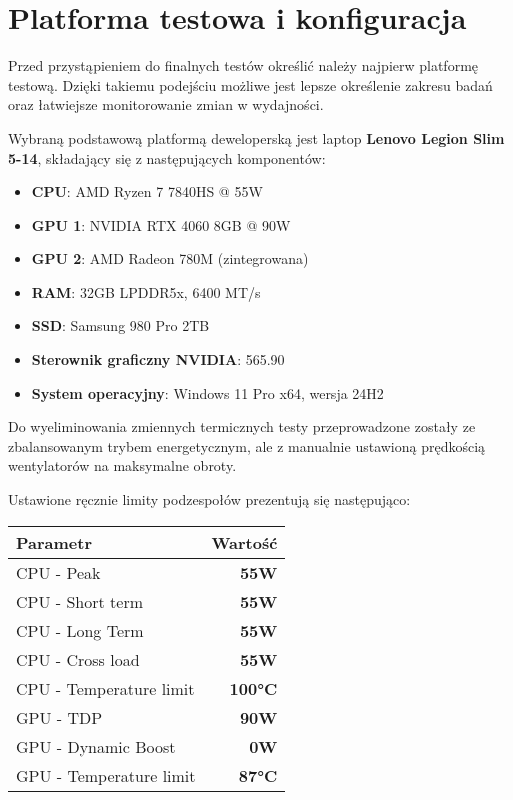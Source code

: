 \chapter{Platforma testowa i konfiguracja}

Przed przystąpieniem do finalnych testów określić należy najpierw
platformę testową. Dzięki takiemu podejściu możliwe jest lepsze określenie zakresu
badań oraz łatwiejsze monitorowanie zmian w wydajności.

Wybraną podstawową platformą deweloperską jest laptop \textbf{Lenovo Legion Slim 5-14}, składający się z następujących komponentów:

\begin{itemize}
	\item \textbf{CPU}: AMD Ryzen 7 7840HS @ 55W
	\item \textbf{GPU 1}: NVIDIA RTX 4060 8GB @ 90W
	\item \textbf{GPU 2}: AMD Radeon 780M (zintegrowana)
	\item \textbf{RAM}: 32GB LPDDR5x, 6400 MT/s
	\item \textbf{SSD}: Samsung 980 Pro 2TB
	\item \textbf{Sterownik graficzny NVIDIA}: 565.90
	\item \textbf{System operacyjny}: Windows 11 Pro x64, wersja 24H2
\end{itemize}

Do wyeliminowania zmiennych termicznych testy przeprowadzone zostały ze zbalansowanym trybem energetycznym, ale z manualnie ustawioną prędkością wentylatorów na maksymalne obroty.

Ustawione ręcznie limity podzespołów prezentują się następująco:

\begin{center}
	\begin{tabular}{ |l r| }
		\hline
		\textbf{Parametr} & \textbf{Wartość} \\
		\hline
		CPU - Peak & \textbf{55W} \\
		CPU - Short term & \textbf{55W} \\
		CPU - Long Term & \textbf{55W} \\
		CPU - Cross load & \textbf{55W} \\
		CPU - Temperature limit & \textbf{100°C} \\
		GPU - TDP & \textbf{90W} \\
		GPU - Dynamic Boost & \textbf{0W} \\
		GPU - Temperature limit & \textbf{87°C} \\
		\hline
	\end{tabular}
\end{center}

